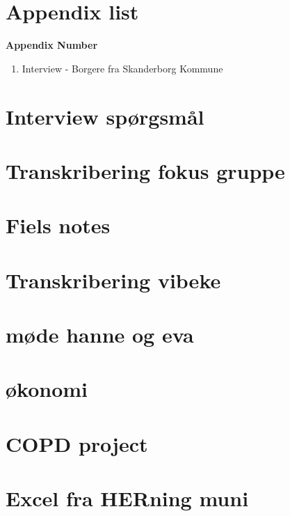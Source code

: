 \chapter{Appendix list}

\textbf{Appendix Number}
\begin{enumerate}
	\item Interview - Borgere fra Skanderborg
Kommune
\end{enumerate}



\chapter{Interview spørgsmål} \label{interviewquestion}

\chapter{Transkribering fokus gruppe}

\chapter{Fiels notes}

\chapter{Transkribering vibeke}

\chapter{møde hanne og eva}

\chapter{økonomi}







\chapter{COPD project}

\chapter{Excel fra HERning muni}
